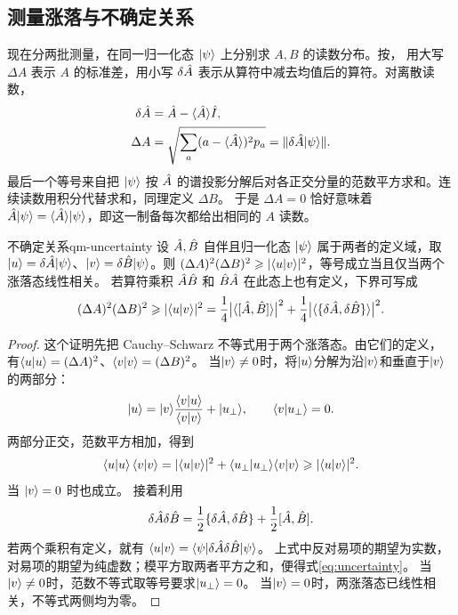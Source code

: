 \subsection{测量涨落与不确定关系}
现在分两批测量，在同一归一化态 $\lvert\psi\rangle$ 上分别求 $A,B$ 的读数分布。按，
用大写 $\Delta A$ 表示 $A$ 的标准差，用小写 $\delta\hat{A}$ 表示从算符中减去均值后的算符。对离散读数，
\begin{subequations}\label{eq:qm-operator-fluctuation}
    \begin{align}
        \delta\hat{A} &= \hat{A} - \langle\hat{A}\rangle\hat{I},\\
        \Delta A &= \sqrt{\sum_a (a - \langle\hat{A}\rangle)^2p_a}
                = \lVert\delta\hat{A}\lvert\psi\rangle\rVert.
    \end{align}
\end{subequations}
最后一个等号来自把 $\lvert\psi\rangle$ 按 $\hat{A}$ 的谱投影分解后对各正交分量的范数平方求和。连续读数用积分代替求和，同理定义 $\Delta B$。
于是 $\Delta A = 0$ 恰好意味着 $\hat{A}\lvert\psi\rangle = \langle\hat{A}\rangle\lvert\psi\rangle$，即这一制备每次都给出相同的 $A$ 读数。

\begin{theorem}{不确定关系}{qm-uncertainty}
    设 $\hat{A},\hat{B}$ 自伴且归一化态 $\lvert\psi\rangle$ 属于两者的定义域，取
    $\lvert u\rangle = \delta \hat{A}\lvert\psi\rangle$、$\lvert v\rangle = \delta \hat{B}\lvert\psi\rangle$。则
    $(\Delta A)^2(\Delta B)^2 \geqslant \lvert\langle u\vert v\rangle\rvert^2$，等号成立当且仅当两个涨落态线性相关。
    若算符乘积 $\hat{A}\hat{B}$ 和 $\hat{B}\hat{A}$ 在此态上也有定义，下界可写成
    \begin{equation}
        (\Delta A)^2(\Delta B)^2 \geqslant \lvert\langle u\vert v\rangle\rvert^2
            = \frac14\bigl\lvert\langle[\hat{A},\hat{B}]\rangle\bigr\rvert^2
            + \frac14\bigl\lvert\langle\{\delta \hat{A},\delta \hat{B}\}\rangle\bigr\rvert^2.
        \label{eq:uncertainty}
    \end{equation}
\end{theorem}
\begin{proof}
这个证明先把 Cauchy--Schwarz 不等式用于两个涨落态。由它们的定义，
有$\langle u\vert u\rangle = (\Delta A)^2$、$\langle v\vert v\rangle = (\Delta B)^2$。
当$\lvert v\rangle \ne 0$时，将$\lvert u\rangle$分解为沿$\lvert v\rangle$和垂直于$\lvert v\rangle$的两部分：
\begin{equation}
    \lvert u\rangle = \lvert v\rangle\frac{\langle v\vert u\rangle}{\langle v\vert v\rangle} + \lvert u_\perp\rangle,
    \qquad \langle v\vert u_\perp\rangle = 0.
\end{equation}
两部分正交，范数平方相加，得到
\[
    \langle u\vert u\rangle\,\langle v\vert v\rangle
      = \lvert\langle u\vert v\rangle\rvert^2 + \langle u_\perp\vert u_\perp\rangle\langle v\vert v\rangle
      \geqslant \lvert\langle u\vert v\rangle\rvert^2 .
\]
当 $\lvert v\rangle = 0$ 时也成立。
接着利用
\begin{equation}
    \delta \hat{A}\delta \hat{B}
    = \frac12\{\delta \hat{A},\delta \hat{B}\} + \frac12[\hat{A},\hat{B}].
\end{equation}
若两个乘积有定义，就有 $\langle u\vert v\rangle = \langle\psi\vert\delta \hat{A}\delta \hat{B}\vert\psi\rangle$。
上式中反对易项的期望为实数，对易项的期望为纯虚数；模平方取两者平方之和，便得式\eqref{eq:uncertainty}。
当$\lvert v\rangle \ne 0$时，范数不等式取等号要求$\lvert u_\perp\rangle = 0$。
当$\lvert v\rangle = 0$时，两涨落态已线性相关，不等式两侧均为零。
\end{proof}

